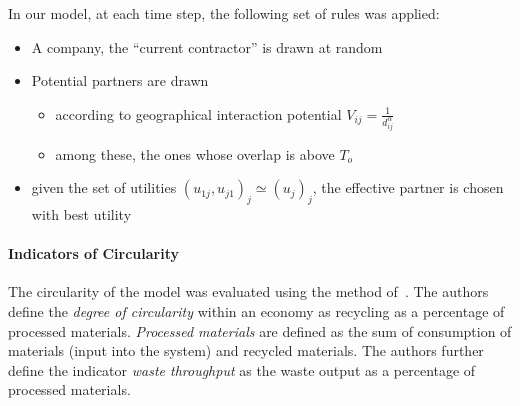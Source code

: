 \documentclass[fleqn,10pt]{wlscirep}
\begin{document}
In our model, at each time step, the following set of rules was applied:
\begin{itemize}
\item A company, the ``current contractor'' is drawn at random %
\item Potential partners are drawn
\begin{itemize}
\item according to geographical interaction potential $V_{ij}=\frac{1}{d_{ij}^{\alpha}}$
\item among these, the ones whose overlap is above $T_o$
\end{itemize}
\item given the set of utilities $(u_{1j},u_{j1})_j \simeq (u_j)_j$, the effective partner is chosen with best utility
\end{itemize}




\paragraph{Indicators of Circularity}


The circularity of the model was evaluated using the method of~\cite{haas2015circular}. The authors define the \textit{degree of circularity} within an economy as recycling as a percentage of processed materials. \textit{Processed materials} are defined as the sum of consumption of materials (input into the system) and recycled materials. The authors further define the indicator \textit{waste throughput} as the waste output as a percentage of processed materials. 
\end{document}
